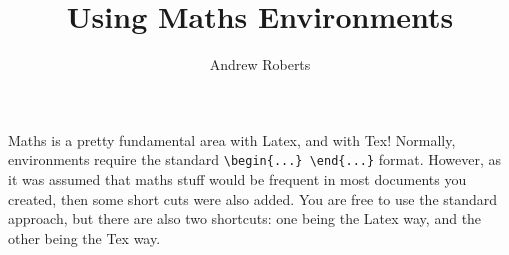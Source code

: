 \documentclass[a4paper]{article}
\begin{document}
\title{Using Maths Environments}
\author{Andrew Roberts}
\date{}
\maketitle

Maths is a pretty fundamental area with Latex, and with Tex! Normally,
environments require the standard \verb|\begin{...} \end{...}| format.
However, as it was assumed that maths stuff would be frequent in most
documents you created, then some short cuts were also added. You are
free to use the standard approach, but there are also two shortcuts: one
being the Latex way, and the other being the Tex way. 
\end{document}
